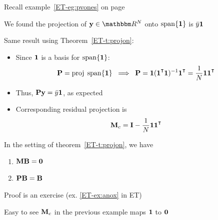 \begin{frame}
    
    \vspace{2em}
    \Eg
    Recall example~\ref{ET-eg:pvones} on page~\pageref{ET-eg:pvones}
    
    We found the projection of $\boldy \in \RR^N$ onto $\operatorname{span}\{{\mathbf 1}\}$ is
    $\bar y {\mathbf 1}$
    
    Same result using Theorem~\eqref{ET-t:projon}:
    \begin{itemize}
        \item Since ${\mathbf 1}$ is a basis for $\operatorname{span}\{{\mathbf 1}\}$:
            \begin{equation*}
                \label{eq:pcz}
                \boldP = \proj \; \Span\{\boldone\} 
                \; \implies \;
                \boldP 
                = \boldone (\boldone^\T\boldone)^{-1} \boldone^\T  
                = \frac{1}{N} \boldone \boldone^\T  
            \end{equation*}
        \item Thus, $\mathbf P {\mathbf y} = \bar y {\mathbf 1}$, as expected
        \item Corresponding residual projection is
        \begin{equation*}
            \label{eq:pczm}
            \boldM_c
            = \boldI - \frac{1}{N} \boldone \boldone^\T  
        \end{equation*}
    \end{itemize}

\end{frame}

\begin{frame}

     \vspace{2em}
    \Fact{\eqref{ET-fa:anox}} 
    In the setting of theorem~\ref{ET-t:projon}, we have 
    \begin{enumerate}
        \item $\mathbf M \mathbf B = {\mathbf 0}$
        \item $\mathbf P \mathbf B = \mathbf B$
    \end{enumerate}
    
    Proof is an exercise (ex. \ref{ET-ex:anox} in ET)
    
    \vspace{1em}
    Easy to see $\mathbf M_c$ in the previous example maps
    ${\mathbf 1}$ to ${\mathbf 0}$
    
\end{frame}

